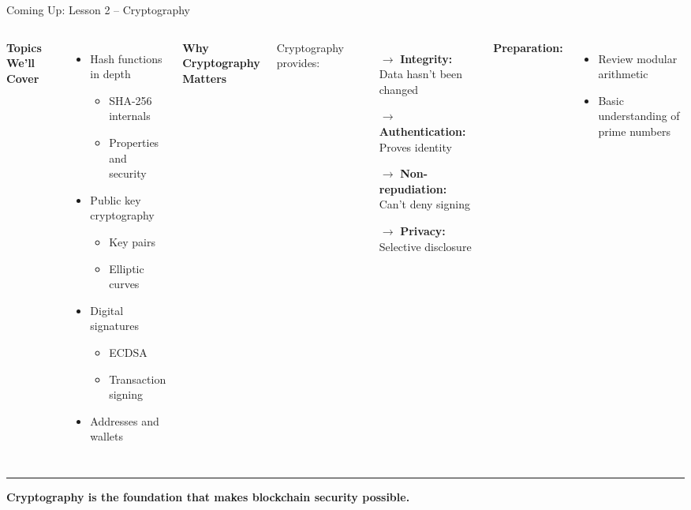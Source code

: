 \documentclass[8pt,aspectratio=169]{beamer}
\newcommand{\bottomnote}[1]{%
\vfill
\vspace{-2mm}
\textcolor{mllavender2}{\rule{\textwidth}{0.4pt}}
\vspace{1mm}
\footnotesize
\textbf{#1}
}
\begin{document}
\begin{frame}[t]{Coming Up: Lesson 2 -- Cryptography}
\begin{columns}[T]
\textbf{Topics We'll Cover}

\vspace{0.5em}
\begin{itemize}
\item Hash functions in depth
\begin{itemize}
\item SHA-256 internals
\item Properties and security
\end{itemize}
\item Public key cryptography
\begin{itemize}
\item Key pairs
\item Elliptic curves
\end{itemize}
\item Digital signatures
\begin{itemize}
\item ECDSA
\item Transaction signing
\end{itemize}
\item Addresses and wallets
\end{itemize}

\textbf{Why Cryptography Matters}

\vspace{0.5em}
Cryptography provides:
\begin{itemize}
\item[\textcolor{mlblue}{$\rightarrow$}] \textbf{Integrity:} Data hasn't been changed
\item[\textcolor{mlgreen}{$\rightarrow$}] \textbf{Authentication:} Proves identity
\item[\textcolor{mlorange}{$\rightarrow$}] \textbf{Non-repudiation:} Can't deny signing
\item[\textcolor{mlpurple}{$\rightarrow$}] \textbf{Privacy:} Selective disclosure
\end{itemize}

\vspace{1em}
\textbf{Preparation:}
\begin{itemize}
\item Review modular arithmetic
\item Basic understanding of prime numbers
\end{itemize}
\end{columns}

\bottomnote{Cryptography is the foundation that makes blockchain security possible.}
\end{frame}
\end{document}
